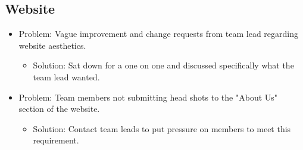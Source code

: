 \documentclass[onecolumn, draftclsnofoot, 10pt, compsoc]{IEEEtran}
\begin{document}
\subsection{Website}
\begin{itemize}
\item Problem: Vague improvement and change requests from team lead regarding website aesthetics. 
\begin{itemize}
\item Solution: Sat down for a one on one and discussed specifically what the team lead wanted.
\end{itemize}
\item Problem: Team members not submitting head shots to the "About Us" section of the website.
\begin{itemize}
\item Solution: Contact team leads to put pressure on members to meet this requirement.
\end{itemize}
\end{itemize}
\end{document}
